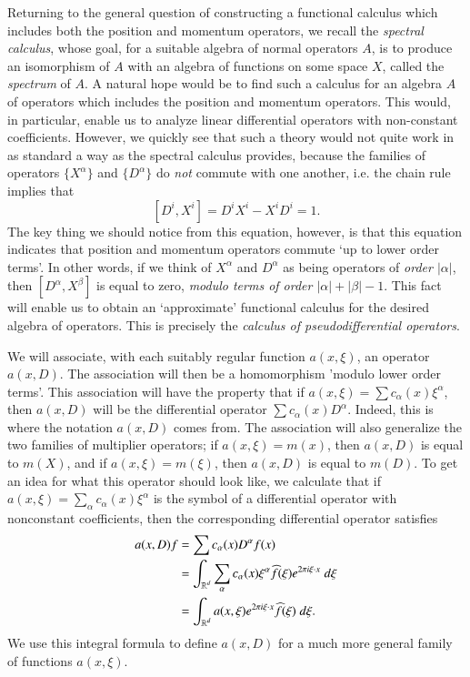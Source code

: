Returning to the general question of constructing a functional calculus which includes both the position and momentum operators, we recall the \emph{spectral calculus}, whose goal, for a suitable algebra of normal operators $A$, is to produce an isomorphism of $A$ with an algebra of functions on some space $X$, called the \emph{spectrum} of $A$. A natural hope would be to find such a calculus for an algebra $A$ of operators which includes the position and momentum operators. This would, in particular, enable us to analyze linear differential operators with non-constant coefficients. However, we quickly see that such a theory would not quite work in as standard a way as the spectral calculus provides, because the families of operators $\{ X^\alpha \}$ and $\{ D^\alpha \}$ do \emph{not} commute with one another, i.e. the chain rule implies that
%
\[ [D^i,X^i] = D^i X^i - X^i D^i = 1. \]
%
The key thing we should notice from this equation, however, is that this equation indicates that position and momentum operators commute `up to lower order terms'. In other words, if we think of $X^\alpha$ and $D^\alpha$ as being operators of \emph{order $|\alpha|$}, then $[D^\alpha,X^\beta]$ is equal to zero, \emph{modulo terms of order $|\alpha| + |\beta| - 1$}. This fact will enable us to obtain an `approximate' functional calculus for the desired algebra of operators. This is precisely the \emph{calculus of pseudodifferential operators}.

We will associate, with each suitably regular function $a(x,\xi)$, an operator $a(x,D)$. The association will then be a homomorphism 'modulo lower order terms'. This association will have the property that if $a(x,\xi) = \sum c_\alpha(x) \xi^\alpha$, then $a(x,D)$ will be the differential operator $\sum c_\alpha(x) D^\alpha$. Indeed, this is where the notation $a(x,D)$ comes from. The association will also generalize the two families of multiplier operators; if $a(x,\xi) = m(x)$, then $a(x,D)$ is equal to $m(X)$, and if $a(x,\xi) = m(\xi)$, then $a(x,D)$ is equal to $m(D)$. To get an idea for what this operator should look like, we calculate that if $a(x,\xi) = \sum_\alpha c_\alpha(x) \xi^\alpha$ is the symbol of a differential operator with nonconstant coefficients, then the corresponding differential operator satisfies
%
\begin{align*}
    a(x,D) f &= \sum c_\alpha(x) D^\alpha f(x)\\
    &= \int_{\operatorname{\mathbb{R}}^d} \sum_\alpha c_\alpha(x) \xi^\alpha \widehat{f}(\xi) e^{2 \pi i \xi \cdot x}\; d\xi\\
    &= \int_{\operatorname{\mathbb{R}}^d} a(x,\xi) e^{2 \pi i \xi \cdot x} \widehat{f}(\xi)\; d\xi.
\end{align*}
%
We use this integral formula to define $a(x,D)$ for a much more general family of functions $a(x,\xi)$.


